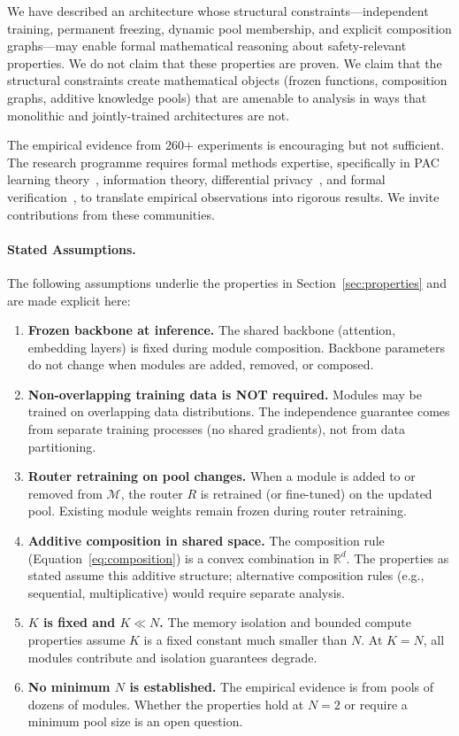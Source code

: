 \documentclass[11pt,a4paper]{article}
\begin{document}
We have described an architecture whose structural constraints---independent training, permanent freezing, dynamic pool membership, and explicit composition graphs---may enable formal mathematical reasoning about safety-relevant properties.
We do not claim that these properties are proven.
We claim that the structural constraints create mathematical objects (frozen functions, composition graphs, additive knowledge pools) that are amenable to analysis in ways that monolithic and jointly-trained architectures are not.

The empirical evidence from 260+ experiments is encouraging but not sufficient.
The research programme requires formal methods expertise, specifically in PAC learning theory~\cite{valiant1984theory}, information theory, differential privacy~\cite{dwork2014algorithmic}, and formal verification~\cite{katz2017reluplex}, to translate empirical observations into rigorous results.
We invite contributions from these communities.

\paragraph{Stated Assumptions.}
The following assumptions underlie the properties in Section~\ref{sec:properties} and are made explicit here:
\begin{enumerate}[nosep,leftmargin=*]
  \item \textbf{Frozen backbone at inference.} The shared backbone (attention, embedding layers) is fixed during module composition. Backbone parameters do not change when modules are added, removed, or composed.
  \item \textbf{Non-overlapping training data is NOT required.} Modules may be trained on overlapping data distributions. The independence guarantee comes from separate training processes (no shared gradients), not from data partitioning.
  \item \textbf{Router retraining on pool changes.} When a module is added to or removed from $\mathcal{M}$, the router $R$ is retrained (or fine-tuned) on the updated pool. Existing module weights remain frozen during router retraining.
  \item \textbf{Additive composition in shared space.} The composition rule (Equation~\ref{eq:composition}) is a convex combination in $\mathbb{R}^d$. The properties as stated assume this additive structure; alternative composition rules (e.g., sequential, multiplicative) would require separate analysis.
  \item \textbf{$K$ is fixed and $K \ll N$.} The memory isolation and bounded compute properties assume $K$ is a fixed constant much smaller than $N$. At $K = N$, all modules contribute and isolation guarantees degrade.
  \item \textbf{No minimum $N$ is established.} The empirical evidence is from pools of dozens of modules. Whether the properties hold at $N = 2$ or require a minimum pool size is an open question.
\end{enumerate}
\end{document}
